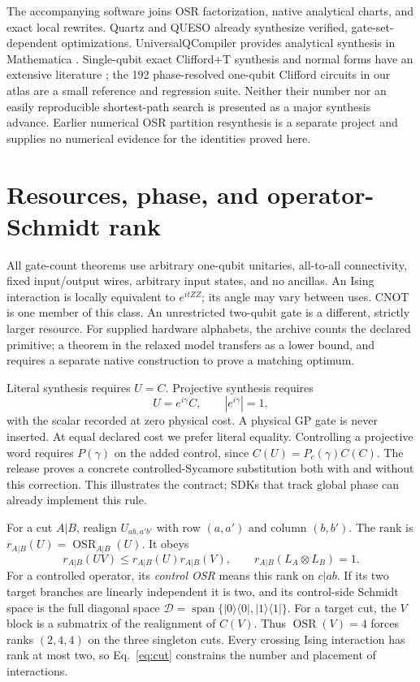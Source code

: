 \documentclass[a4paper,onecolumn,11pt,unpublished]{quantumarticle}
\newcommand{\OSR}{\operatorname{OSR}}
\begin{document}
The accompanying software joins OSR factorization, native analytical charts,
and exact local rewrites. Quartz \cite{quartz} and QUESO \cite{queso} already
synthesize verified, gate-set-dependent optimizations. UniversalQCompiler
provides analytical synthesis in Mathematica \cite{universalqcompiler}.
Single-qubit exact Clifford+T synthesis and normal forms have an extensive
literature \cite{matsumoto,kmm,giles,gilesma}; the 192 phase-resolved
one-qubit Clifford circuits in our atlas are a small reference and regression
suite. Neither their number nor an easily reproducible shortest-path search
is presented as a major synthesis advance. Earlier numerical OSR partition
resynthesis \cite{partition} is a separate project and supplies no numerical
evidence for the identities proved here.

\section{Resources, phase, and operator-Schmidt rank}
All gate-count theorems use arbitrary one-qubit unitaries, all-to-all
connectivity, fixed input/output wires, arbitrary input states, and no
ancillas. An Ising interaction is locally equivalent to $e^{itZZ}$;
its angle may vary between uses. CNOT is one member of this class.
An unrestricted two-qubit gate is a different, strictly larger resource.
For supplied hardware alphabets, the archive counts the declared primitive;
a theorem in the relaxed model transfers as a lower bound, and requires a
separate native construction to prove a matching optimum.

Literal synthesis requires $U=C$. Projective synthesis requires
\begin{equation} U=e^{i\gamma}C,\qquad |e^{i\gamma}|=1,\label{eq:phase}\end{equation}
with the scalar recorded at zero physical cost. A physical GP gate is never
inserted. At equal declared cost we prefer literal equality. Controlling a
projective word requires $P(\gamma)$ on the added control, since
$C(U)=P_c(\gamma)C(C)$. The release proves a concrete controlled-Sycamore
substitution both with and without this correction. This illustrates the
contract; SDKs that track global phase can already implement this rule.

For a cut $A|B$, realign $U_{ab,a'b'}$ with row $(a,a')$ and column $(b,b')$.
The rank is $r_{A|B}(U)=\OSR_{A|B}(U)$. It obeys
\begin{equation}
 r_{A|B}(UV)\le r_{A|B}(U)r_{A|B}(V),\qquad
 r_{A|B}(L_A\otimes L_B)=1.\label{eq:cut}
\end{equation}
For a controlled operator, its \emph{control OSR} means this rank on
$c|ab$. If its two target branches are linearly independent it is two,
and its control-side Schmidt space is the full diagonal space
$\mathcal D=\operatorname{span}\{|0\rangle\langle0|,|1\rangle\langle1|\}$.
For a target cut, the $V$ block is a submatrix of the realignment of $C(V)$.
Thus $\OSR(V)=4$ forces ranks $(2,4,4)$ on the three singleton cuts.
Every crossing Ising interaction has rank at most two, so Eq.~\eqref{eq:cut}
constrains the number and placement of interactions.
\end{document}
